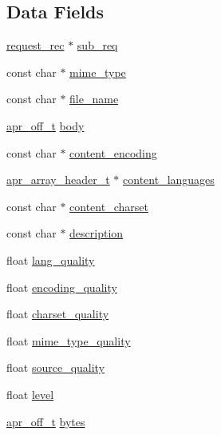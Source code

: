 \subsection*{Data Fields}
\begin{DoxyCompactItemize}
\item 
\hyperlink{structrequest__rec}{request\+\_\+rec} $\ast$ \hyperlink{structvar__rec_ac3207312c3e51dce5b1ce1f4623e51cd}{sub\+\_\+req}
\item 
const char $\ast$ \hyperlink{structvar__rec_a2319c7c3665971f26d0edad6428f98ab}{mime\+\_\+type}
\item 
const char $\ast$ \hyperlink{structvar__rec_ac99f0145cb681542cdeee5b03d443e14}{file\+\_\+name}
\item 
\hyperlink{group__apr__platform_ga6938af9075cec15c88299109381aa984}{apr\+\_\+off\+\_\+t} \hyperlink{structvar__rec_a536f18c02f976bda1f0cd939b7a3e0b3}{body}
\item 
const char $\ast$ \hyperlink{structvar__rec_a02ea86341edd8b3f447e003c7bb3d1fb}{content\+\_\+encoding}
\item 
\hyperlink{structapr__array__header__t}{apr\+\_\+array\+\_\+header\+\_\+t} $\ast$ \hyperlink{structvar__rec_ad30460f1980cc315c44dd853189bc923}{content\+\_\+languages}
\item 
const char $\ast$ \hyperlink{structvar__rec_a0c53995e73f53b735dc19503a1addfc6}{content\+\_\+charset}
\item 
const char $\ast$ \hyperlink{structvar__rec_a2f5d8a1ab237e60136b324ae491b87bd}{description}
\item 
float \hyperlink{structvar__rec_a37c2b2d647eca8dab4f968bff7e932f6}{lang\+\_\+quality}
\item 
float \hyperlink{structvar__rec_a38e13aa3394911cc728befd3db9d1ea6}{encoding\+\_\+quality}
\item 
float \hyperlink{structvar__rec_af4598a948f5d2d2fba013d69665c0bb0}{charset\+\_\+quality}
\item 
float \hyperlink{structvar__rec_a1f6b0a407bfa86bcb67ed573a566b7f8}{mime\+\_\+type\+\_\+quality}
\item 
float \hyperlink{structvar__rec_a8199c3a45754e9ae50d7f7e5f106b072}{source\+\_\+quality}
\item 
float \hyperlink{structvar__rec_a3ec4d8b51111a5e6734fc02a82f1731e}{level}
\item 
\hyperlink{group__apr__platform_ga6938af9075cec15c88299109381aa984}{apr\+\_\+off\+\_\+t} \hyperlink{structvar__rec_a04607cd44f1869d294b8c1476e9dbc2f}{bytes}
\item 

\end{DoxyCompactItemize}
